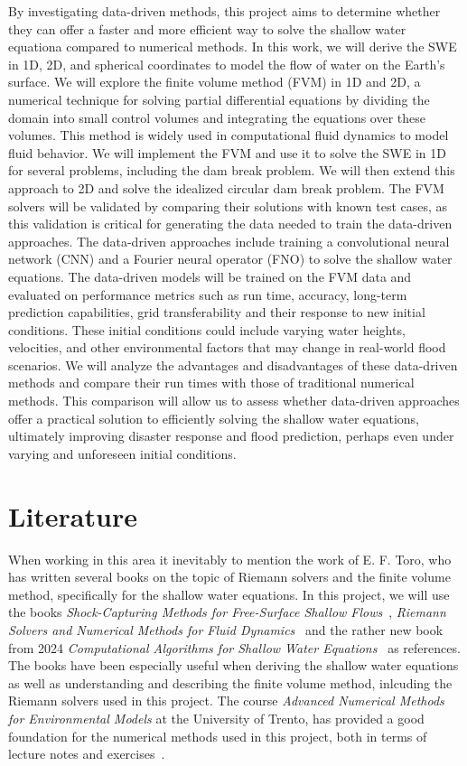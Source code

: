 By investigating data-driven methods, this project aims to determine whether they can offer a faster and more efficient way to solve the shallow water equationa compared to numerical methods.
In this work, we will derive the SWE in 1D, 2D, and spherical coordinates to model the flow of water on the Earth's surface.
We will explore the finite volume method (FVM) in 1D and 2D, a numerical technique for solving partial differential equations by dividing the domain into small control volumes and integrating the equations over these volumes.
This method is widely used in computational fluid dynamics to model fluid behavior.
We will implement the FVM and use it to solve the SWE in 1D for several problems, including the dam break problem. We will then extend this approach to 2D and solve the idealized circular dam break problem.
The FVM solvers will be validated by comparing their solutions with known test cases, as this validation is critical for generating the data needed to train the data-driven approaches.
The data-driven approaches include training a convolutional neural network (CNN) and a Fourier neural operator (FNO) to solve the shallow water equations.
The data-driven models will be trained on the FVM data and evaluated on performance metrics such as run time, accuracy, long-term prediction capabilities, grid transferability and their response to new initial conditions.
These initial conditions could include varying water heights, velocities, and other environmental factors that may change in real-world flood scenarios.
We will analyze the advantages and disadvantages of these data-driven methods and compare their run times with those of traditional numerical methods.
This comparison will allow us to assess whether data-driven approaches offer a practical solution to efficiently solving the shallow water equations, ultimately improving disaster response and flood prediction, perhaps even under varying and unforeseen initial conditions.

\section{Literature}
When working in this area it inevitably to mention the work of E. F. Toro, who has written several books on the topic of Riemann solvers and the finite volume method, specifically for the shallow water equations.
In this project, we will use the books \textit{Shock-Capturing Methods for Free-Surface Shallow Flows}~\cite{Toro2001-Shock}, \textit{Riemann Solvers and Numerical Methods for Fluid Dynamics}~\cite{Toro2009-Riemann} and the rather new book from 2024 \textit{Computational Algorithms for Shallow Water Equations}~\cite{Toro2024} as references.
The books have been especially useful when deriving the shallow water equations as well as understanding and describing the finite volume method, inlcuding the Riemann solvers used in this project.
The course \textit{Advanced Numerical Methods for Environmental Models} at the University of Trento, has provided a good foundation for the numerical methods used in this project, both in terms of lecture notes and exercises~\cite{trento_course}.

